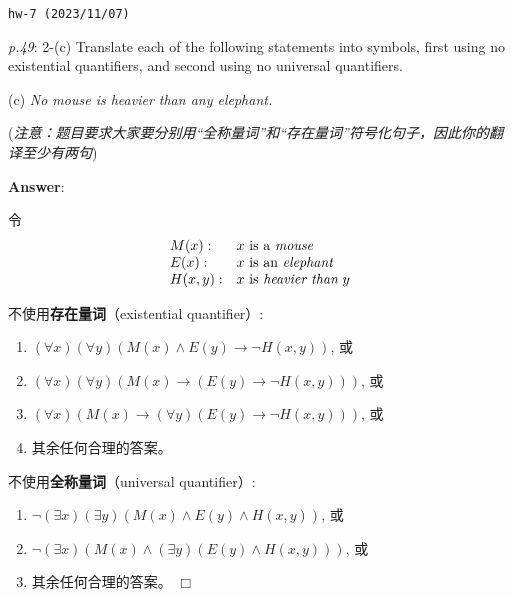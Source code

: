 \documentclass[UTF8,12pt,a4paper]{ctexart}
\begin{document}
\noindent\texttt{hw-7 (2023/11/07)}

\emph{p.49}: 2-(c) \quad
Translate each of the following statements into symbols, {\color{purple} first} using no existential quantifiers, and {\color{purple} second} using no universal quantifiers. 

\qquad (c) \hspace{3cm}  \textit{No mouse is heavier than any elephant.}

(\textit{注意：题目要求大家要分别用“全称量词”和“存在量词”符号化句子，因此你的翻译至少有两句})

\noindent\textbf{Answer}:   

令 
\[\begin{array}{l l l}
	M(x):& x \text{ is a \textit{mouse}}\\
	E(x): & x \text{ is an \textit{elephant}}\\
	H(x,y): & x \text{ is \textit{heavier than}\;} y \\
\end{array}\]

不使用\textbf{存在量词}（existential quantifier）: 
\begin{enumerate}
	\item $(\forall x) (\forall y) (M(x) \land E(y) \to \neg H(x,y))$, 或
	
	\item $(\forall x) (\forall y) (M(x) \to (E(y) \to \neg H(x,y)))$, 或
	
	\item $(\forall x)  (M(x) \to (\forall y) (E(y) \to \neg H(x,y)))$, 或
	
	\item 其余任何合理的答案。
\end{enumerate}

\vspace{1em}

不使用\textbf{全称量词}（universal quantifier）:
\begin{enumerate}
	\item $\neg (\exists x) (\exists y) (M(x) \land E(y) \land H(x,y))$, 或
	
	\item $\neg (\exists x)  (M(x) \land (\exists y) (E(y) \land H(x,y)))$, 或
	
	\item 其余任何合理的答案。
	\hfill $\Box$
\end{enumerate}



\vspace{1em}
\end{document}
